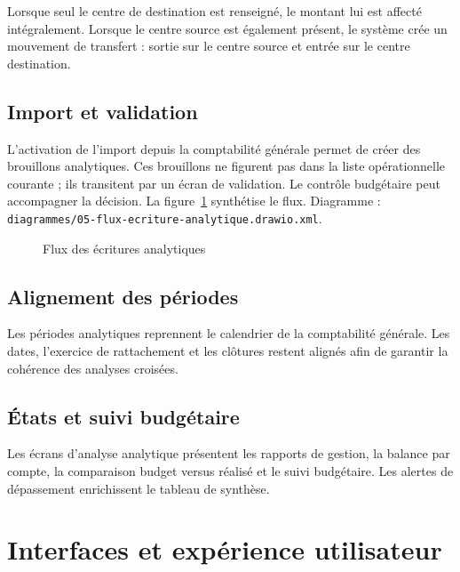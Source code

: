 \documentclass[12pt,a4paper]{report}
\begin{document}
Lorsque seul le centre de destination est renseigné, le montant lui est affecté intégralement. Lorsque le centre source est également présent, le système crée un mouvement de transfert : sortie sur le centre source et entrée sur le centre destination.

\section{Import et validation}

L'activation de l'import depuis la comptabilité générale permet de créer des brouillons analytiques. Ces brouillons ne figurent pas dans la liste opérationnelle courante ; ils transitent par un écran de validation. Le contrôle budgétaire peut accompagner la décision. La figure~\ref{fig:ca-flux} synthétise le flux. Diagramme : \texttt{diagrammes/05-flux-ecriture-analytique.drawio.xml}.

\begin{figure}[htbp]
\centering
{}
\caption{Flux des écritures analytiques}
\label{fig:ca-flux}
\end{figure}

\section{Alignement des périodes}

Les périodes analytiques reprennent le calendrier de la comptabilité générale. Les dates, l'exercice de rattachement et les clôtures restent alignés afin de garantir la cohérence des analyses croisées.

\section{États et suivi budgétaire}

Les écrans d'analyse analytique présentent les rapports de gestion, la balance par compte, la comparaison budget versus réalisé et le suivi budgétaire. Les alertes de dépassement enrichissent le tableau de synthèse.

\chapter{Interfaces et expérience utilisateur}
\end{document}
